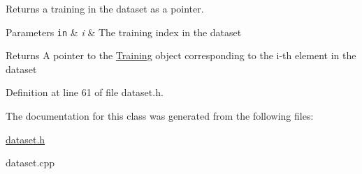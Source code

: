 Returns a training in the dataset as a pointer. 


\begin{DoxyParams}[1]{Parameters}
\mbox{\tt in}  & {\em i} & The training index in the dataset\\
\hline
\end{DoxyParams}
\begin{DoxyReturn}{Returns}
A pointer to the \hyperlink{class_training}{Training} object corresponding to the i-\/th element in the dataset 
\end{DoxyReturn}


Definition at line 61 of file dataset.\-h.



The documentation for this class was generated from the following files\-:\begin{DoxyCompactItemize}
\item 
\hyperlink{dataset_8h}{dataset.\-h}\item 
dataset.\-cpp\end{DoxyCompactItemize}
